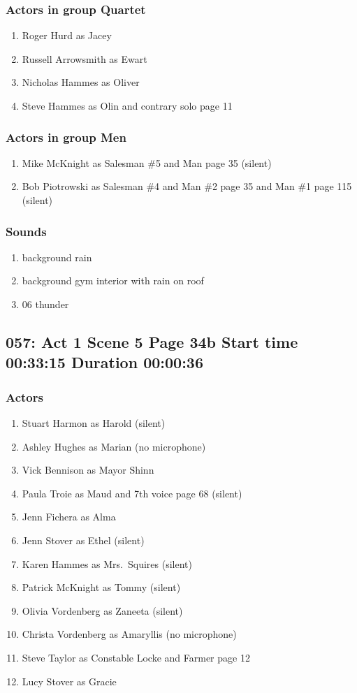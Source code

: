 \subsubsection{Actors in group Quartet}
\begin{enumerate}
\item Roger Hurd as Jacey
\item Russell Arrowsmith as Ewart
\item Nicholas Hammes as Oliver
\item Steve Hammes as Olin and contrary solo page 11
\end{enumerate}
\subsubsection{Actors in group Men}
\begin{enumerate}
\item Mike McKnight as Salesman \#5 and Man page 35 (silent)
\item Bob Piotrowski as Salesman \#4 and Man \#2 page 35 and Man \#1 page 115 (silent)
\end{enumerate}

\subsubsection{Sounds}
\begin{enumerate}
\item background rain
\item background gym interior with rain on roof
\item 06 thunder
\end{enumerate}
\subsection{057: Act 1 Scene 5 Page 34b Start time 00:33:15 Duration 00:00:36}

\subsubsection{Actors}
\begin{enumerate}
\item Stuart Harmon as Harold (silent)
\item Ashley Hughes as Marian (no microphone)
\item Vick Bennison as Mayor Shinn
\item Paula Troie as Maud and 7th voice page 68 (silent)
\item Jenn Fichera as Alma
\item Jenn Stover as Ethel (silent)
\item Karen Hammes as Mrs.~Squires (silent)
\item Patrick McKnight as Tommy (silent)
\item Olivia Vordenberg as Zaneeta (silent)
\item Christa Vordenberg as Amaryllis (no microphone)
\item Steve Taylor as Constable Locke and Farmer page 12
\item Lucy Stover as Gracie
\end{enumerate}
